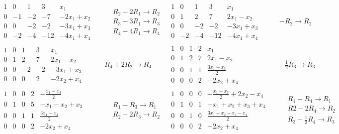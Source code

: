 \documentclass{report}
\begin{document}
\begin{align*}
	&\begin{array}{cccc|c}
		1 & 0 & 1 & 3 & x_1 \\
		0 & -1 & -2 & -7 & -2x_1 + x_2 \\
		0 & 0 & -2 & -2 & -3x_1 + x_3 \\
		0 & -2 & -4 & -12 & -4x_1 + x_4
	\end{array}
	&& \begin{aligned} & R_2 - 2R_1 \rightarrow R_2 \\ & R_3 - 3R_1 \rightarrow R_3 \\ & R_4 - 4R_1 
	\rightarrow R_4 \end{aligned}
	&\begin{array}{cccc|c}
		1 & 0 & 1 & 3 & x_1 \\
		0 & 1 & 2 & 7 & 2x_1 - x_2 \\
		0 & 0 & -2 & -2 & -3x_1 + x_3 \\
		0 & -2 & -4 & -12 & -4x_1 + x_4
	\end{array}
	&& -R_2 \rightarrow R_2 \\
	&\begin{array}{cccc|c}
		1 & 0 & 1 & 3 &  x_1 \\
		0 & 1 & 2 & 7 & 2x_1 - x_2 \\
		0 & 0 & -2 & -2 & -3x_1 + x_3 \\
		0 & 0 & 0 & 2 & -2x_2 + x_4
	\end{array}
	&& R_4 + 2R_2 \rightarrow R_4
	&\begin{array}{cccc|c}
		1 & 0 & 1 & 2 &  x_1 \\
		0 & 1 & 2 & 7 & 2x_1 - x_2 \\
		0 & 0 & 1 & 1 & \frac{3x_1 - x_3}{2} \\
		0 & 0 & 0 & 2 & -2x_2 + x_4
	\end{array}
	&& -\frac{1}{2}R_3 \rightarrow R_3 \\
	&\begin{array}{cccc|c}
		1 & 0 & 0 & 2 &  -\frac{x_1 -x_3}{2}\\
		0 & 1 & 0 & 5 & -x_1-x_2+x_3\\
		0 & 0 & 1 & 1 & \frac{3x_1 - x_3}{2} \\
		0 & 0 & 0 & 2 & -2x_2 + x_4
	\end{array}
	&& \begin{aligned} & R_1 - R_3 \rightarrow R_1 \\ & R_2 - 2R_3 \rightarrow R_2\end{aligned}
	&\begin{array}{cccc|c}
		1 & 0 & 0 & 0 & -\frac{x_1 - x_3}{2} + 2x_2 -x_4 \\
		0 & 1 & 0 & 1 & -x_1 + x_2 + x_3 + x_4 \\
		0 & 0 & 1 & 0 & \frac{3x_1 + x_2 - x_3 - x_4}{2} \\
		0 & 0 & 0 & 2 & -2x_2 + x_4
	\end{array}
	&& \begin{aligned} & R_1 - R_4 \rightarrow R_1 \\ & R2 - 2R_4 \rightarrow R_2 \\ & R_3 - \frac{1}{2}R_4 
	\rightarrow R_3\end{aligned}
\end{align*}
\end{document}
